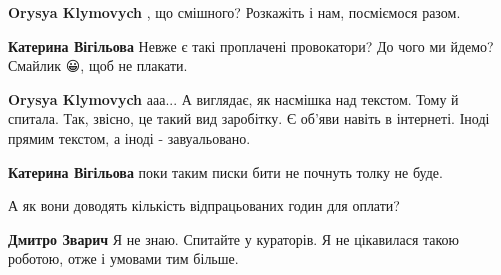 \begin{itemize}
\begin{itemize}
\textbf{Orysya Klymovych} , що смішного? Розкажіть і нам, посміємося разом.

 
\textbf{Катерина Вігільова}
Невже є такі проплачені провокатори?
До чого ми йдемо?
Смайлик 😀, щоб не плакати.

 
\textbf{Orysya Klymovych} ааа... А виглядає, як насмішка над текстом. Тому й спитала.
Так, звісно, це такий вид заробітку. Є об'яви навіть в інтернеті. Іноді прямим текстом, а іноді - завуальовано.

 
\textbf{Катерина Вігільова} поки таким писки бити не почнуть толку не буде.

 
А як вони доводять кількість відпрацьованих годин для оплати?

 
\textbf{Дмитро Зварич} Я не знаю. Спитайте у кураторів. Я не цікавилася такою роботою, отже і умовами тим більше.
\end{itemize}

 

\end{itemize}
